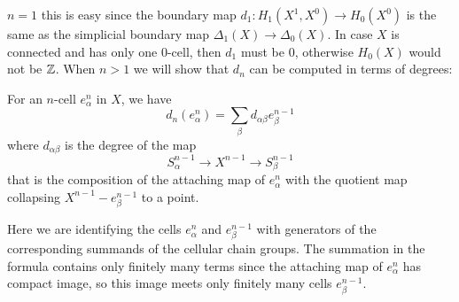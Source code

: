 $n=1$ this is easy since the boundary map $d_1:H_1(X^1,X^0)\to H_0(X^0)$ is the same as the simplicial boundary map $\Delta_1(X)\to\Delta_0(X)$. In case $X$ is connected and has only one $0$-cell, then $d_1$ must be $0$, otherwise $H_0(X)$ would not be $\mathbb{Z}$. When $n>1$ we will show that $d_n$ can be computed in terms of degrees:
\begin{proposition}
For an $n$-cell $e_\alpha^n$ in $X$, we have
\[d_n(e^n_\alpha)=\sum_\beta d_{\alpha\beta}e^{n-1}_\beta\]
where $d_{\alpha\beta}$ is the degree of the map 
\[S^{n-1}_\alpha\to X^{n-1}\to S^{n-1}_\beta\]
that is the composition of the attaching map of $e^n_\alpha$ with the quotient map collapsing $X^{n-1}-e^{n-1}_\beta$ to a point.
\end{proposition}
Here we are identifying the cells $e^n_\alpha$ and $e^{n-1}_\beta$ with generators of the corresponding summands of the cellular chain groups. The summation in the formula contains only finitely many terms since the attaching map of $e^n_\alpha$ has compact image, so this image
meets only finitely many cells $e^{n-1}_\beta$.
